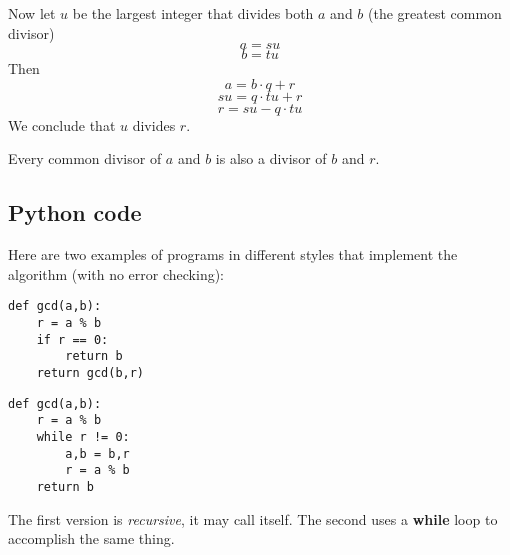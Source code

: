 \documentclass[11pt, oneside]{article}
\begin{document}
Now let $u$ be the largest integer that divides both $a$ and $b$ (the greatest common divisor)
\[ a = su \]
\[ b = tu \]
Then 
\[ a = b \cdot q + r \]
\[ su = q \cdot tu + r \]
\[ r = su - q \cdot tu \]
We conclude that $u$ divides $r$.

Every common divisor of $a$ and $b$ is also a divisor of $b$ and $r$.

\subsection*{Python code}

Here are two examples of programs in different styles that implement the algorithm (with no error checking):

\begin{verbatim}
def gcd(a,b):
    r = a % b
    if r == 0:
        return b
    return gcd(b,r)
\end{verbatim}

\begin{verbatim}
def gcd(a,b):
    r = a % b
    while r != 0:
        a,b = b,r
        r = a % b
    return b
\end{verbatim}

The first version is \emph{recursive}, it may call itself.  The second uses a \textbf{while} loop to accomplish the same thing.
\end{document}
